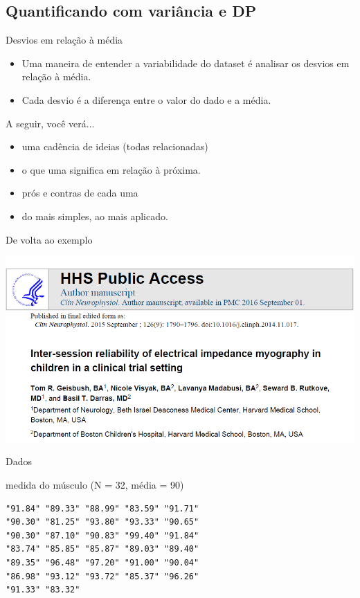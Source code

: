 \documentclass{beamer}
\begin{document}
\subsection{Quantificando com variância e DP}

\begin{frame}{Desvios em relação à média}
  \begin{itemize}
  \item Uma maneira de entender a variabilidade do dataset é analisar
    os desvios em relação à média.
  \item Cada desvio é a diferença entre o valor do dado e a média.
  \end{itemize}
\end{frame}

\begin{frame}{A seguir, você verá...}
  \begin{itemize}
  \item  uma cadência de ideias (todas relacionadas)
  \item o que uma significa em relação à próxima.
  \item prós e contras de cada uma
  \item do mais \alert{simples}, ao mais \alert{aplicado}.
  \end{itemize}
\end{frame}

\begin{frame}{De volta ao exemplo}
  \begin{center}
    \includegraphics[width=1.2\textwidth]{Cap3/DP1}
  \end{center}
\end{frame}

\begin{frame}[fragile]{Dados}
  \begin{block}{medida do músculo (N = 32, média = 90)}
\begin{verbatim}
"91.84" "89.33" "88.99" "83.59" "91.71"
"90.30" "81.25" "93.80" "93.33" "90.65"
"90.30" "87.10" "90.83" "99.40" "91.84"
"83.74" "85.85" "85.87" "89.03" "89.40"
"89.35" "96.48" "97.20" "91.00" "90.04"
"86.98" "93.12" "93.72" "85.37" "96.26"
"91.33" "83.32"
\end{verbatim}
  \end{block}
\end{frame}
\end{document}
